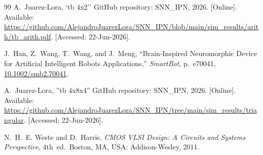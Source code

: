 \documentclass[letter, 12pt]{article}
\begin{document}
\begin{thebibliography}{99}
A.~Juarez-Lora, `tb 4x2'' GitHub repository: SNN\_IPN, 2026. [Online]. Available: \url{https://github.com/AlejandroJuarezLora/SNN_IPN/blob/main/sim_results/arith/tb_arith.pdf}. [Accessed: 22-Jun-2026].

J.~Han, Z.~Wang, T.~Wang, and J.~Meng,
``Brain-Inspired Neuromorphic Device for Artificial Intelligent Robots Applications,''
\emph{SmartBot}, p.~e70041, 
\url{10.1002/smb2.70041}.

A.~Juarez-Lora, ''tb 4x8x4'' GitHub repository: SNN\_IPN, 2026. [Online]. Available: \url{https://github.com/AlejandroJuarezLora/SNN_IPN/tree/main/sim_results/triangular}. [Accessed: 22-Jun-2026].

N.~H.~E. Weste and D.~Harris, \emph{CMOS VLSI Design: A Circuits and Systems Perspective}, 4th~ed.\ Boston, MA, USA: Addison-Wesley, 2011.


\end{thebibliography}
\end{document}

